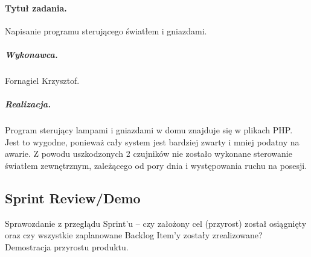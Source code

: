 	\paragraph{Tytuł zadania.} Napisanie programu sterującego światłem i gniazdami.
	\subparagraph{Wykonawca.} Fornagiel Krzysztof.
	\subparagraph{Realizacja.} Program sterujący lampami i gniazdami w domu znajduje się w plikach PHP. Jest to wygodne, ponieważ cały system jest bardziej zwarty i mniej podatny na awarie. Z powodu uszkodzonych 2 czujników nie zostało wykonane sterowanie światłem zewnętrznym, zależącego od pory dnia i występowania ruchu na posesji.

	
	\subsection{Sprint Review/Demo}
	Sprawozdanie z przeglądu Sprint'u -- czy założony cel (przyrost) został osiągnięty oraz czy wszystkie zaplanowane Backlog Item'y zostały zrealizowane? Demostracja przyrostu produktu.
	